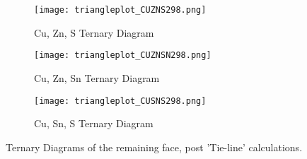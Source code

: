 \begin{figure}
\centering
\begin{subfigure}{80mm}
  \centering
    \texttt{[image: triangleplot\_CUZNS298.png]}
    \caption{Cu, Zn, S Ternary Diagram}
    \label{fig:CuZnS}
\end{subfigure}%
\begin{subfigure}{80mm}
 \centering
    \texttt{[image: triangleplot\_CUZNSN298.png]}
    \caption{Cu, Zn, Sn Ternary Diagram}
    \label{fig:CuZnSn}
\end{subfigure}
\begin{subfigure}{80mm}
 \centering
    \texttt{[image: triangleplot\_CUSNS298.png]}
    \caption{Cu, Sn, S Ternary Diagram}
    \label{fig:CuSnS}
\end{subfigure}
\caption{Ternary Diagrams of the remaining face, post 'Tie-line' calculations.}
\label{fig:RemainingFaces}
\end{figure}